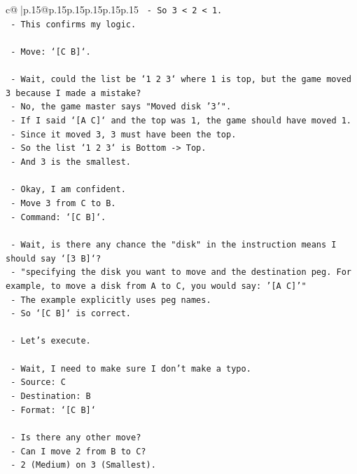 \documentclass{article}
\begin{document}
{\begin{supertabular}{c@{$\;$}|p{.15\linewidth}@{}p{.15\linewidth}p{.15\linewidth}p{.15\linewidth}p{.15\linewidth}p{.15\linewidth}}
{{{\texttt{  {-} So 3 < 2 < 1.} \\
\texttt{  {-} This confirms my logic.} \\
\\ 
\texttt{  {-} Move: `{[}C B{]}`.} \\
\\ 
\texttt{  {-} Wait, could the list be `1 2 3` where 1 is top, but the game moved 3 because I made a mistake?} \\
\texttt{  {-} No, the game master says "Moved disk '3'".} \\
\texttt{  {-} If I said `{[}A C{]}` and the top was 1, the game should have moved 1.} \\
\texttt{  {-} Since it moved 3, 3 must have been the top.} \\
\texttt{  {-} So the list `1 2 3` is Bottom {-}> Top.} \\
\texttt{  {-} And 3 is the smallest.} \\
\\ 
\texttt{  {-} Okay, I am confident.} \\
\texttt{  {-} Move 3 from C to B.} \\
\texttt{  {-} Command: `{[}C B{]}`.} \\
\\ 
\texttt{  {-} Wait, is there any chance the "disk" in the instruction means I should say `{[}3 B{]}`?} \\
\texttt{  {-} "specifying the disk you want to move and the destination peg. For example, to move a disk from A to C, you would say: '{[}A C{]}'"} \\
\texttt{  {-} The example explicitly uses peg names.} \\
\texttt{  {-} So `{[}C B{]}` is correct.} \\
\\ 
\texttt{  {-} Let's execute.} \\
\\ 
\texttt{  {-} Wait, I need to make sure I don't make a typo.} \\
\texttt{  {-} Source: C} \\
\texttt{  {-} Destination: B} \\
\texttt{  {-} Format: `{[}C B{]}`} \\
\\ 
\texttt{  {-} Is there any other move?} \\
\texttt{  {-} Can I move 2 from B to C?} \\
\texttt{  {-} 2 (Medium) on 3 (Smallest).} \\
}}}
\end{supertabular}}
\end{document}

